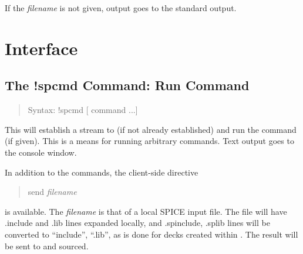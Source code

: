 If the {\it filename} is not given, output goes to the standard
output.


\section{{\WRspice} Interface}

\subsection{The {\cb !spcmd} Command: Run {\WRspice} Command}
\begin{quote}
Syntax: {\vt !spcmd} [{\WRspice} command ...]
\end{quote}
This will establish a stream to {\WRspice} (if not already
established) and run the command (if given).  This is a means for
running arbitrary {\WRspice} commands.  Text output goes to the
console window.

In addition to the {\WRspice} commands, the client-side directive
\begin{quote}
{\vt send} {\it filename}
\end{quote}
is available.  The {\it filename} is that of a local SPICE input file. 
The file will have {\vt .include} and {\vt .lib} lines expanded
locally, and {\vt .spinclude}, {\vt .splib} lines will be converted to
``{\vt include}'', ``{\vt .lib}'', as is done for decks created within
{\Xic}.  The result will be sent to {\WRspice} and sourced.

